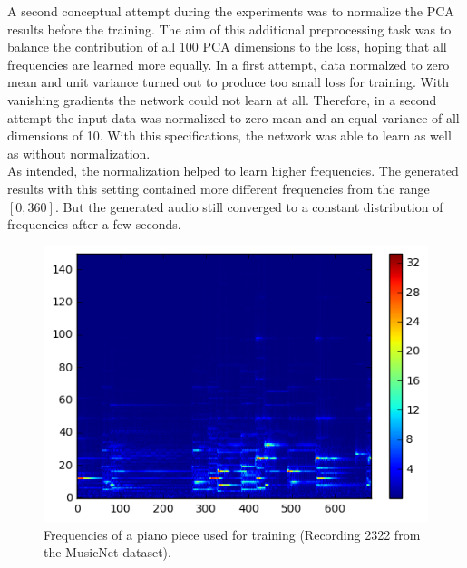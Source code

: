 \documentclass[10pt,conference,compsocconf]{IEEEtran}
\begin{document}
A second conceptual attempt during the experiments was to normalize the PCA results before the training. The aim of this additional preprocessing task was to balance the contribution of all 100 PCA dimensions to the loss, hoping that all frequencies are learned more equally. In a first attempt, data normalzed to zero mean and unit variance turned out to produce too small loss for training. With vanishing gradients the network could not learn at all. Therefore, in a second attempt the input data was normalized to zero mean and an equal variance of all dimensions of 10. With this specifications, the network was able to learn as well as without normalization.\\
As intended, the normalization helped to learn higher frequencies. The generated results with this setting contained more different frequencies from the range $[0,360]$. But the generated audio still converged to a constant distribution of frequencies after a few seconds. 
\begin{figure}[tbp]
  \centering
  \includegraphics[width=\columnwidth]{figures/original_frequencies.png}
  \caption{Frequencies of a piano piece used for training (Recording 2322 from the MusicNet dataset). }
  \label{fig:original_frequencies}
\end{figure}
\end{document}
